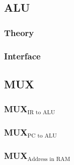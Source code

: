 \documentclass[11pt]{article}
\begin{document}
\subsection{ALU}
\label{sec:org7114248}
\subsubsection{Theory}
\label{sec:orgf20ee77}
\subsubsection{Interface}
\label{sec:org09ca388}
\subsection{MUX}
\label{sec:orge647b52}
\subsubsection{MUX\(_{\text{IR to ALU}}\)}
\label{sec:org7a42dc1}
\subsubsection{MUX\(_{\text{PC to ALU}}\)}
\label{sec:orga5b05aa}
\subsubsection{MUX\(_{\text{Address in RAM}}\)}
\label{sec:org5d38cb4}
\end{document}
